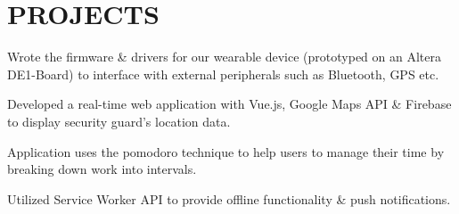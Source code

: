 \documentclass[]{constants}
\begin{document}
\begin{minipage}[t]{0.66\textwidth}
 \newline
{}
\sectionsep

\section{PROJECTS}
 \newline
{} 
\begin{tightemize}
\item Wrote the firmware \& drivers for our wearable device (prototyped on an Altera DE1-Board) to interface with external peripherals such as Bluetooth, GPS etc.
\item Developed a real-time web application with Vue.js, Google Maps API \& Firebase to display security guard's location data.
\end{tightemize}
\sectionsep

 \newline
{} 
\begin{tightemize}
\item Application uses the pomodoro technique to help users to manage their time by breaking down work into intervals.
\item Utilized Service Worker API to provide offline functionality \& push notifications.
\end{tightemize}
\sectionsep


\end{minipage}
\end{document}
